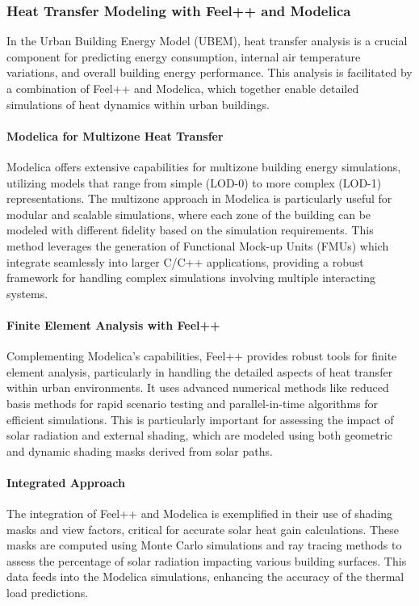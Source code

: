 \documentclass[runningheads]{llncs}
\begin{document}
\subsubsection{Heat Transfer Modeling with Feel++ and Modelica}
In the Urban Building Energy Model (UBEM), heat transfer analysis is a crucial component for predicting energy consumption, internal air temperature variations, and overall building energy performance. This analysis is facilitated by a combination of Feel++ and Modelica, which together enable detailed simulations of heat dynamics within urban buildings.

\paragraph{Modelica for Multizone Heat Transfer}
Modelica offers extensive capabilities for multizone building energy simulations, utilizing models that range from simple (LOD-0) to more complex (LOD-1) representations. The multizone approach in Modelica is particularly useful for modular and scalable simulations, where each zone of the building can be modeled with different fidelity based on the simulation requirements. This method leverages the generation of Functional Mock-up Units (FMUs) which integrate seamlessly into larger C/C++ applications, providing a robust framework for handling complex simulations involving multiple interacting systems.

\paragraph{Finite Element Analysis with Feel++}
Complementing Modelica's capabilities, Feel++ provides robust tools for finite element analysis, particularly in handling the detailed aspects of heat transfer within urban environments. It uses advanced numerical methods like reduced basis methods for rapid scenario testing and parallel-in-time algorithms for efficient simulations. This is particularly important for assessing the impact of solar radiation and external shading, which are modeled using both geometric and dynamic shading masks derived from solar paths.

\paragraph{Integrated Approach}
The integration of Feel++ and Modelica is exemplified in their use of shading masks and view factors, critical for accurate solar heat gain calculations. These masks are computed using Monte Carlo simulations and ray tracing methods to assess the percentage of solar radiation impacting various building surfaces. This data feeds into the Modelica simulations, enhancing the accuracy of the thermal load predictions.
\end{document}
